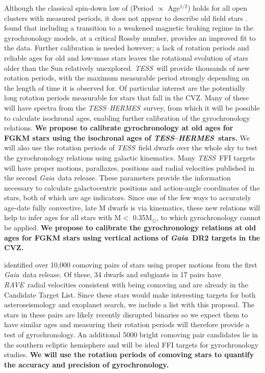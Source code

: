 \documentclass[letterpaper,12pt,preprint]{hack_aastex}
\newcommand{\TESS}{{\it TESS}}
\newcommand{\tess}{{\it TESS}}
\newcommand{\Gaia}{{\it Gaia}}
\newcommand{\RAVE}{{\it RAVE}}
\newcommand{\hermes}{{\it HERMES}}
\newcommand{\HERMES}{{\it HERMES}}
\begin{document}
Although the classical spin-down law of \citet{skumanich1972} (Period
$\propto$ Age$^{1/2}$) holds for all open clusters with measured periods, it does
not appear to describe old field stars \citep{angus2015, van-saders2016}.
\citet{van-saders2016} found that including a transition to a weakened magnetic
braking regime in the gyrochronology models, at a critical Rossby number,
provides an improved fit to the data.
Further calibration is needed however; a lack of rotation periods and reliable
ages for old and low-mass stars leaves the rotational evolution of stars older
than the Sun relatively unexplored.
\TESS\ will provide thousands of new rotation periods, with the maximum
measurable period strongly depending on the length of time it is observed for.
Of particular interest are the potentially long rotation periods measurable
for stars that fall in the CVZ.
Many of these will have spectra from the \TESS --\HERMES\ survey, from which
it will be possible to calculate isochronal ages, enabling further calibration
of the gyrochronology relations.
{\bf We propose to calibrate gyrochronology at old ages for FGKM stars using
the isochronal ages of \TESS--\hermes\ stars.}
We will also use the rotation periods of \TESS\ field dwarfs over the whole sky
to test the gyrochronology relations using galactic kinematics.
Many \tess\ FFI targets will have proper motions, parallaxes, positions and
radial velocities published in the second \Gaia\ data release.
These parameters provide the information necessary to calculate galactocentric
positions and action-angle coordinates of the stars, both of which are age
indicators.
Since one of the few ways to accurately age-date fully convective, late M
dwarfs is via kinematics, these new relations will help to infer ages for all
stars with M$<$ 0.35M$_\odot$, to which gyrochronology cannot be applied.
{\bf We propose to calibrate the gyrochronology relations at old ages for FGKM
stars using vertical actions of \Gaia\ DR2 targets in the CVZ.}

\citet{oh2016} identified over 10,000 comoving pairs of stars using proper
motions from the first \Gaia\ data release.
Of these, 34 dwarfs and subgiants in 17 pairs have \RAVE\ radial velocities
consistent with being comoving and are already in the Candidate Target List.
Since these stars would make interesting targets for both asteroseismology and
exoplanet search, we include a list with this proposal.
The stars in these pairs are likely recently disrupted binaries so we
expect them to have similar ages and measuring their rotation periods will
therefore provide a test of gyrochronology.
An additional 5000 bright comoving pair candidates lie in the southern
ecliptic hemisphere and will be ideal FFI targets for gyrochronology studies.
{\bf We will use the rotation periods of comoving stars to quantify the
accuracy and precision of gyrochronology.}
\end{document}
